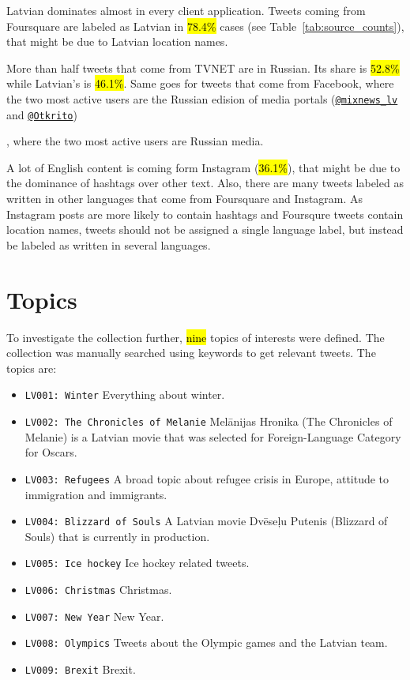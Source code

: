 \documentclass{IOS-Book-Article}
\makeatletter
\newcommand{\sn}[1]{\href{https://twitter.com/#1}{\texttt{@#1}}}
\makeatother
\begin{document}

Latvian dominates almost in every client application. Tweets coming from Foursquare are labeled as Latvian in \hl{78.4\%} cases (see Table~\ref{tab:source_counts}), that might be due to Latvian location names.

More than half tweets that come from TVNET are in Russian. Its share is \hl{52.8\%} while Latvian's is \hl{46.1\%}. Same goes for tweets that come from Facebook, where the two most active users are the Russian edision of media portals (\sn{mixnews\_lv} and \sn{Otkrito})

, where the two most active users are Russian media.

A lot of English content is coming form Instagram (\hl{36.1\%}), that might be due to the dominance of hashtags over other text. Also, there are many tweets labeled as written in other languages that come from Foursquare and Instagram. As Instagram posts are more likely to contain hashtags and Foursqure tweets contain location names, tweets should not be assigned a single language label, but instead be labeled as written in several languages.



\section{Topics}
\label{sec:topics}

To investigate the collection further, \hl{nine} topics of interests were defined. The collection was manually searched using keywords to get relevant tweets. The topics are:
\begin{itemize}
\item \texttt{LV001: Winter} Everything about winter.
\item \texttt{LV002: 
The Chronicles of Melanie} Mel\=anijas Hronika (The Chronicles of Melanie) is a Latvian movie that was selected for Foreign-Language Category for Oscars.
\item \texttt{LV003: Refugees} A broad topic about refugee crisis in Europe, attitude to immigration and immigrants.
\item \texttt{LV004: Blizzard of Souls} A Latvian movie Dv\=ese\c{l}u Putenis (Blizzard of Souls) that is currently in production.
\item \texttt{LV005: Ice hockey} Ice hockey related tweets.
\item \texttt{LV006: Christmas} Christmas.
\item \texttt{LV007: New Year} New Year.
\item \texttt{LV008: Olympics} Tweets about the Olympic games and the Latvian team.
\item \texttt{LV009: Brexit} Brexit.
\end{itemize}
\end{document}
